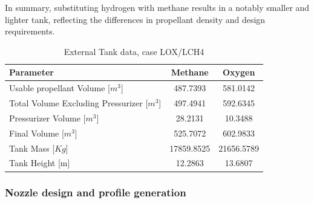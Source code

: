 In summary, substituting hydrogen with methane results in a notably smaller and lighter tank, reflecting the differences in propellant density and design requirements.


\begin{table}[H]
\centering
\begin{tabular}{|l|c|c|}
\hline
\textbf{Parameter} & \textbf{Methane} & \textbf{Oxygen} \\ \hline
Usable propellant Volume [$m^3$] & 487.7393 & 581.0142 \\ \hline
Total Volume Excluding Pressurizer [$m^3$] & 497.4941 & 592.6345 \\ \hline
Pressurizer Volume [$m^3$] & 28.2131 & 10.3488 \\ \hline
Final Volume [$m^3$]& 525.7072 & 602.9833 \\ \hline
Tank Mass [$Kg$] & 17859.8525 & 21656.5789 \\ \hline
Tank Height [m] & 12.2863 & 13.6807 \\ \hline
\end{tabular}
\caption{External Tank data, case LOX/LCH4}
\label{tab:propellant_methane_oxygen}
\end{table}

\subsubsection{Nozzle design and profile generation}
